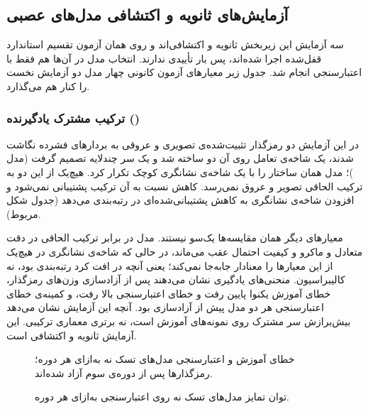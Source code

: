 \subsection{آزمایش‌های ثانویه و اکتشافی مدل‌های عصبی}

سه آزمایش این زیربخش ثانویه و اکتشافی‌اند و روی همان آزمون تقسیم استاندارد قفل‌شده اجرا شده‌اند، پس بار تأییدی ندارند. انتخاب مدل در آن‌ها هم فقط با اعتبارسنجی انجام شد. جدول زیر معیارهای آزمون کانونی چهار مدل دو آزمایش نخست را کنار هم می‌گذارد.



\subsubsection{ترکیب مشترک یادگیرنده ()}

در این آزمایش دو رمزگذار تثبیت‌شده‌ی تصویری و عروقی به بردارهای فشرده نگاشت شدند، یک شاخه‌ی تعامل روی آن دو ساخته شد و یک سر چندلایه تصمیم گرفت (مدل )؛ مدل  همان ساختار را با یک شاخه‌ی نشانگری کوچک تکرار کرد. هیچ‌یک از این دو به ترکیب الحاقی تصویر و عروق نمی‌رسد. کاهش  نسبت به آن ترکیب پشتیبانی نمی‌شود و افزودن شاخه‌ی نشانگری به  کاهش پشتیبانی‌شده‌ای در رتبه‌بندی می‌دهد (جدول شکل مربوط).

معیارهای دیگر همان مقایسه‌ها یک‌سو نیستند. مدل  در برابر ترکیب الحاقی در دقت متعادل و  ماکرو و کیفیت احتمال عقب می‌ماند، در حالی که شاخه‌ی نشانگری در  هیچ‌یک از این معیارها را معنادار جابه‌جا نمی‌کند؛ یعنی آنچه در  افت کرد رتبه‌بندی بود، نه کالیبراسیون. منحنی‌های یادگیری نشان می‌دهند پس از آزادسازی وزن‌های رمزگذار، خطای آموزش یکنوا پایین رفت و خطای اعتبارسنجی بالا رفت، و کمینه‌ی خطای اعتبارسنجی هر دو مدل پیش از آزادسازی بود. آنچه این آزمایش نشان می‌دهد بیش‌برازش سر مشترک روی نمونه‌های آموزش است، نه برتری معماری ترکیبی. این آزمایش ثانویه و اکتشافی است.

\begin{figure}[htbp]
  \centering
  \caption{خطای آموزش و اعتبارسنجی مدل‌های تسک نه به‌ازای هر دوره؛ رمزگذارها پس از دوره‌ی سوم آزاد شده‌اند.}
  \label{fig:U6}
\end{figure}

\begin{figure}[htbp]
  \centering
  \caption{توان تمایز مدل‌های تسک نه روی اعتبارسنجی به‌ازای هر دوره.}
  \label{fig:U7}
\end{figure}

